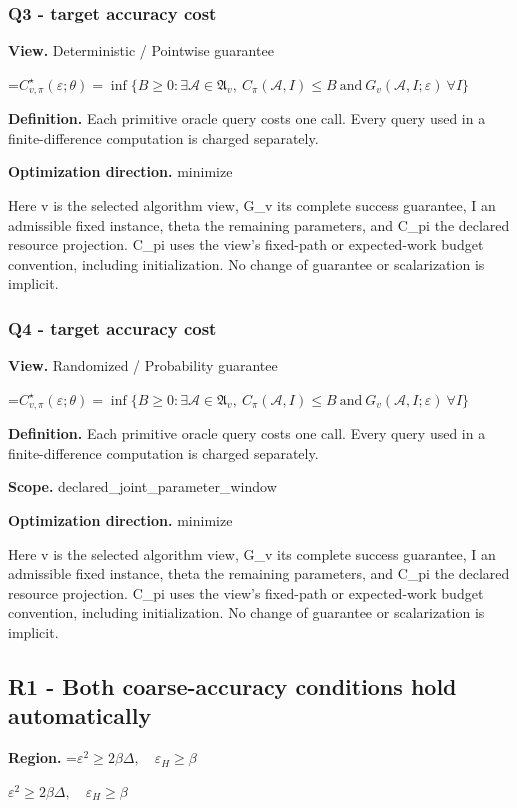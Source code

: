 \documentclass[10pt,a4paper]{article}
\newcommand{\AtlasMath}[1]{\par\begingroup\centering\setbox0=\hbox{$\displaystyle #1$}\ifdim\wd0>1.4\linewidth\typeout{ATLAS WIDE FORMULA: \the\wd0}\fi\ifdim\wd0>\linewidth\resizebox{\linewidth}{!}{\box0}\else\box0\fi\par\endgroup}
\newcommand{\AtlasInlineMath}[1]{\begingroup\setbox0=\hbox{$#1$}\ifdim\wd0>.4\linewidth\endgroup\AtlasMath{#1}\else\endgroup$#1$\fi}
\begin{document}
\subsubsection{Q3 - target accuracy cost}
\textbf{View.} Deterministic / Pointwise guarantee

\AtlasMath{C^\star_{v,\pi}(\varepsilon;\theta)=\inf\{B\ge0:\exists\mathcal A\in\mathfrak A_v,\ C_\pi(\mathcal A,I)\le B\ \text{and}\ G_v(\mathcal A,I;\varepsilon)\ \forall I\}}
\textbf{Definition.} Each primitive oracle query costs one call. Every query used in a finite-difference computation is charged separately.

\textbf{Optimization direction.} minimize

Here v is the selected algorithm view, G\_v its complete success guarantee, I an admissible fixed instance, theta the remaining parameters, and C\_pi the declared resource projection. C\_pi uses the view's fixed-path or expected-work budget convention, including initialization. No change of guarantee or scalarization is implicit.

\subsubsection{Q4 - target accuracy cost}
\textbf{View.} Randomized / Probability guarantee

\AtlasMath{C^\star_{v,\pi}(\varepsilon;\theta)=\inf\{B\ge0:\exists\mathcal A\in\mathfrak A_v,\ C_\pi(\mathcal A,I)\le B\ \text{and}\ G_v(\mathcal A,I;\varepsilon)\ \forall I\}}
\textbf{Definition.} Each primitive oracle query costs one call. Every query used in a finite-difference computation is charged separately.

\textbf{Scope.} declared\_joint\_parameter\_window

\textbf{Optimization direction.} minimize

Here v is the selected algorithm view, G\_v its complete success guarantee, I an admissible fixed instance, theta the remaining parameters, and C\_pi the declared resource projection. C\_pi uses the view's fixed-path or expected-work budget convention, including initialization. No change of guarantee or scalarization is implicit.

\subsection{R1 - Both coarse-accuracy conditions hold automatically}
\textbf{Region.} \AtlasInlineMath{\varepsilon^2\ge2\beta\Delta,\quad\varepsilon_H\ge\beta}
\end{document}
